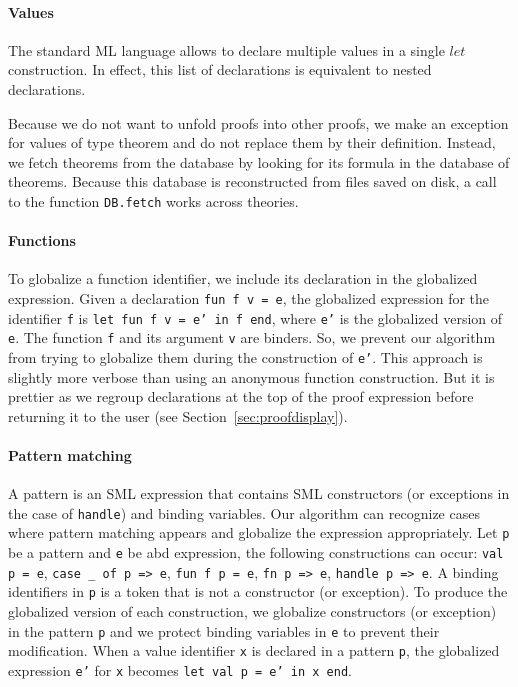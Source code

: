 \documentclass[runningheads,a4paper,draft]{svjour3}
\def\sml{\textsf{SML}\xspace}
\begin{document}
\paragraph{Values}
The standard ML language allows to declare multiple values in a single $let$ 
construction. In effect, this list of declarations is equivalent to nested 
declarations. 

Because we do not want to unfold proofs into other proofs, we 
make an exception 
for values of type theorem and do not replace them by their definition.
Instead, we fetch theorems from the 
database by looking for its formula in the database of theorems.
Because this database is reconstructed from files saved on disk, a call to 
the function \texttt{DB.fetch} works across theories.

\paragraph{Functions}
To globalize a function identifier, we include 
its declaration in the globalized expression. 
Given a declaration \texttt{fun f v = e}, the globalized 
expression for the identifier \texttt{f} is \texttt{let fun f v = e' in f 
end}, where \texttt{e'} is the globalized version of \texttt{e}. The function 
\texttt{f} and its argument \texttt{v} are binders. So, we prevent our 
algorithm from trying to globalize them during the construction of \texttt{e'}.
This approach is slightly more verbose than using an 
anonymous function construction. But it is prettier as 
we regroup declarations at the top of the proof expression before returning it
to the user (see Section~\ref{sec:proofdisplay}).

\paragraph{Pattern matching}
A pattern is an \sml expression that 
contains \sml 
constructors (or exceptions in the case of \texttt{handle}) and binding 
variables. Our algorithm can recognize cases where pattern matching appears and 
globalize the expression appropriately.  Let \texttt{p} be a pattern 
and 
\texttt{e} be abd expression, the following constructions can 
occur: \texttt{val p = e}, \texttt{case \_ of p => e}, \texttt{fun f p = e}, 
\texttt{fn p => e}, \texttt{handle p => e}. A binding identifiers in \texttt{p}
is a token that is not a constructor (or exception). To produce the globalized 
version of each construction, we globalize constructors (or exception) in the 
pattern \texttt{p} and we protect binding variables in \texttt{e} to prevent 
their modification. When a value identifier \texttt{x} is declared in a pattern 
\texttt{p}, the globalized expression \texttt{e'} for \texttt{x} becomes 
\texttt{let val p = e' in x end}.
\end{document}
